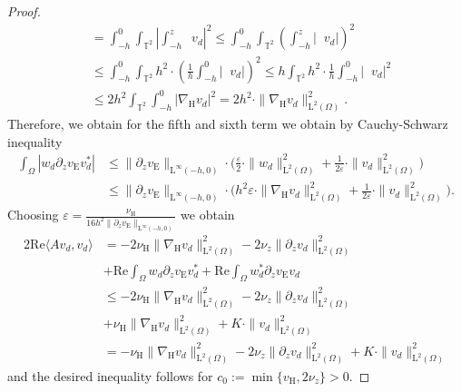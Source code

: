 \documentclass[preprint]{elsarticle}
\numberwithin{equation}{section}
\newcommand {\T}	{\mathbb{T}}
\DeclareMathOperator{\divH}{div_{\H}}
\renewcommand{\Re}{\mathrm{Re}}
\renewcommand{\H}{\mathrm{H}}
\newcommand{\dk}[1]{\partial_{#1}}
\newcommand{\dz}{\dk{z}}
\newcommand{\nablaH}{\nabla_{\H}}
\newcommand{\rL}{\mathrm{L}}
\newcommand{\rH}{\H}
\newcommand{\rE}{\mathrm{E}}
\begin{document}
\begin{proof}
\begin{equation}
\begin{aligned}
			&= \int_{-h}^0 \int_{\T^2} \left| \int_{-h}^z \divH v_d \right|^2
			\leq \int_{-h}^0 \int_{\T^2} \left( \int_{-h}^z |\divH v_d| \right)^2 \\
			&\leq \int_{-h}^0 \int_{\T^2} h^2 \cdot \left( \frac{1}{h} \int_{-h}^0 |\divH v_d| \right)^2 
			\leq h \int_{\T^2} h^2 \cdot \frac{1}{h} \int_{-h}^0 |\divH v_d|^2  \\
			&\leq 2 h^2 \int_{\T^2} \int_{-h}^0 |\nablaH v_d|^2 = 2 h^2 \cdot \| \nablaH v_d \|_{\rL^2(\Omega)}^2 .
		\end{aligned}
	\end{equation}
	Therefore, we obtain for the fifth and sixth term we obtain by Cauchy-Schwarz inequality
	\begin{align*}
		\int_{\Omega} |w_d \dz v_{\rE} v_d^\ast|
		&\leq \| \dz v_{\rE} \|_{\rL^\infty(-h,0)} \cdot \biggl( \frac{\varepsilon}{2} \cdot \| w_d \|_{\rL^2(\Omega)}^2
		+ \frac{1}{2\varepsilon} \cdot \| v_d \|_{\rL^2(\Omega)}^2 \biggr)\\
		&\leq \| \dz v_{\rE} \|_{\rL^\infty(-h,0)} \cdot \biggl( h^2 \varepsilon \cdot \| \nablaH v_d \|_{\rL^2(\Omega)}^2
		+ \frac{1}{2\varepsilon} \cdot 
		\| v_d \|_{\rL^2(\Omega)}^2 \biggr) .
	\end{align*}
	Choosing $\varepsilon = \tfrac{\nu_{\rH}}{16 h^2 \| \partial_z v_{\rE} \|_{\rL^\infty(-h,0)}}$ we obtain  
	\begin{align*}
		2\Re \langle A v_d, v_d \rangle 
		&= -2\nu_{\rH} \| \nablaH v_d \|_{\rL^2(\Omega)}^2
		- 2\nu_z \| \dz v_d \|_{\rL^2(\Omega)}^2 \\
		&+ \Re \int_{\Omega} w_d \dz v_{\rE} v_d^\ast
		+ \Re \int_{\Omega} w_d^\ast \dz v_{\rE} v_d \\
		&\leq -2\nu_{\rH} \| \nablaH v_d \|_{\rL^2(\Omega)}^2
		- 2\nu_z \| \dz v_d \|_{\rL^2(\Omega)}^2 \\
		&+ \nu_{\rH} \| \nablaH v_d \|_{\rL^2(\Omega)}^2
		+  K \cdot \| v_d \|_{\rL^2(\Omega)}^2 \\
		&= -\nu_{\rH} \| \nablaH v_d \|_{\rL^2(\Omega)}^2
		- 2\nu_z \| \dz v_d \|_{\rL^2(\Omega)}^2
		+ K \cdot \| v_d \|_{\rL^2(\Omega)}^2  
	\end{align*}
	and the desired inequality follows for $c_0 := \min\{ v_{\rH},2\nu_z \} > 0$.

\end{proof}
\end{document}
